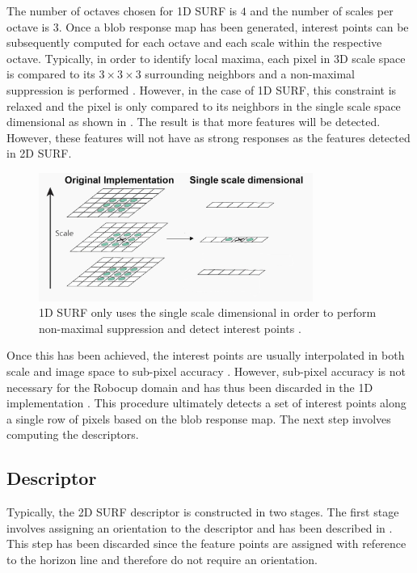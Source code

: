 \documentclass[11pt]{report}
\begin{document}
The number of octaves chosen for 1D SURF is $4$ and the number of scales per octave is $3$. Once a blob response map has been generated, interest points can be subsequently computed for each octave and each scale within the respective octave. Typically, in order to identify local maxima, each pixel in 3D scale space is compared to its $3 \times 3 \times 3$ surrounding neighbors and a non-maximal suppression is performed \cite{Evans2009}. However, in the case of 1D SURF, this constraint is relaxed and the pixel is only compared to its neighbors in the single scale space dimensional as shown in  \cite{Anderson}. The result is that more features will be detected. However, these features will not have as strong responses as the features detected in 2D SURF.\\

\begin{figure}[h!] 
  \centering
    \includegraphics[width=0.8\textwidth]{../Drawings/methods/SURF1D_Nonmaximal_suppression.jpg}
    \caption{1D SURF only uses the single scale dimensional in order to perform non-maximal suppression and detect interest points \cite{Anderson}.}
    \label{fig:singleScale}
\end{figure}

Once this has been achieved, the interest points are usually interpolated in both scale and image space to sub-pixel accuracy \cite{Evans2009}. However, sub-pixel accuracy is not necessary for the Robocup domain and has thus been discarded in the 1D implementation \cite{Anderson}. This procedure ultimately detects a set of interest points along a single row of pixels based on the blob response map. The next step involves computing the descriptors.\\  

\subsection{Descriptor}
\label{sec:1dsurfDescribe}
Typically, the 2D SURF descriptor is constructed in two stages. The first stage involves assigning an orientation to the descriptor and has been described in . This step has been discarded since the feature points are assigned with reference to the horizon line and therefore do not require an orientation.\\
\end{document}
